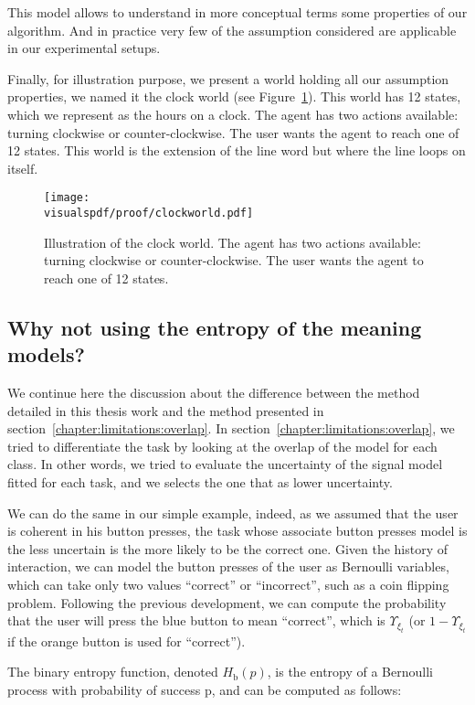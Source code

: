 This model allows to understand in more conceptual terms some properties of our algorithm. And in practice very few of the assumption considered are applicable in our experimental setups.

Finally, for illustration purpose, we present a world holding all our assumption properties, we named it the clock world (see Figure~\ref{fig:clockworld}). This world has 12 states, which we represent as the hours on a clock. The agent has two actions available: turning clockwise or counter-clockwise. The user wants the agent to reach one of 12 states. This world is the extension of the line word but where the line loops on itself.

\begin{figure}[!ht]
\centering
\texttt{[image: \\visualspdf/proof/clockworld.pdf]}
\caption{Illustration of the clock world. The agent has two actions available: turning clockwise or counter-clockwise. The user wants the agent to reach one of 12 states.}
\label{fig:clockworld}
\end{figure} 

\subsection{Why not using the entropy of the meaning models?}

We continue here the discussion about the difference between the method detailed in this thesis work and the method presented in section~\ref{chapter:limitations:overlap}. In section~\ref{chapter:limitations:overlap}, we tried to differentiate the task by looking at the overlap of the model for each class. In other words, we tried to evaluate the uncertainty of the signal model fitted for each task, and we selects the one that as lower uncertainty.

We can do the same in our simple example, indeed, as we assumed that the user is coherent in his button presses, the task whose associate button presses model is the less uncertain is the more likely to be the correct one. Given the history of interaction, we can model the button presses of the user as Bernoulli variables, which can take only two values ``correct'' or ``incorrect'', such as a coin flipping problem. Following the previous development, we can compute the probability that the user will press the blue button to mean ``correct'', which is $\Upsilon_{\xi_t}$ (or $1-\Upsilon_{\xi_t}$ if the orange button is used for ``correct'').

The binary entropy function, denoted $H_{\mathrm b}(p)$, is the entropy of a Bernoulli process with probability of success p, and can be computed as follows:

